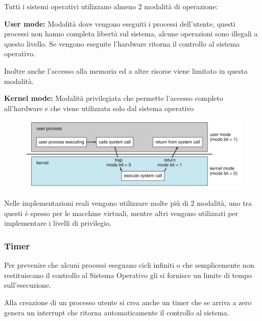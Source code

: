 Tutti i sistemi operativi utilizzano almeno 2 modalità di operazione:
\spacer
\begin{sitemize}
    \item \textbf{User mode:} Modalità dove vengono eseguiti i processi dell'utente, questi processi non hanno completa libertà sul sistema, alcune operazioni sono illegali a questo livello. Se vengono eseguite l'hardware ritorna il controllo al sistema operativo.

    Inoltre anche l'accesso alla memoria ed a altre risorse viene limitato in questa modalità.

    \item \textbf{Kernel mode:} Modalità privilegiata che permette l'accesso completo all'hardware e che viene utilizzata solo dal sistema operativo
\end{sitemize}

\begin{figure}[H]
    \centering
    \includegraphics[width=0.65\linewidth]{assets/multimode.jpeg}
\end{figure}

Nelle implementazioni reali vengono utilizzare molte più di 2 modalità, uno tra questi è spesso per le macchine virtuali, mentre altri vengono utilizzati per implementare i livelli di privilegio.

\subsubsection{Timer}
Per prevenire che alcuni processi eseguano cicli infiniti o che semplicemente non restituiscano il controllo al Sistema Operativo gli si fornisce un limite di tempo sull'esecuzione.

Alla creazione di un processo utente si crea anche un timer che se arriva a zero genera un interrupt che ritorna automaticamente il controllo al sistema.
